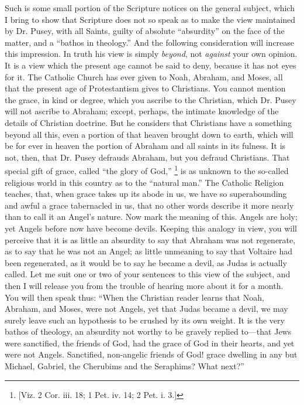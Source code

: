 Such is some small portion of the Scripture
notices on the general subject, which I bring to show that Scripture
does not so speak as to make the view maintained by Dr. Pusey, with
all Saints, guilty of absolute ``absurdity'' on the face of the matter,
and a ``bathos in theology.'' And the following consideration will
increase this impression. In truth his view is simply \emph{beyond},
not \emph{against} your own opinion. It is a view which the present
age cannot be said to deny, because it has not eyes for it. The
Catholic Church has ever given to Noah, Abraham, and Moses, all that
the present age of Protestantism gives to Christians. You cannot
mention the grace, in kind or degree, which you ascribe to the
Christian, which Dr. Pusey will not ascribe to Abraham; except,
perhaps, the intimate knowledge of the details of Christian doctrine.
But he considers that Christians have a something beyond all
this, even a portion of that heaven brought down to earth, which will
be for ever in heaven the portion of Abraham and all saints in its
fulness. It is not, then, that Dr. Pusey defrauds Abraham, but you
defraud Christians. That special gift of grace, called ``the glory of
God,'' \footnote{[Viz. 2 Cor. iii. 18; 1 Pet. iv. 14; 2 Pet. i. 3.]} is as unknown to
the so-called religious world in this country as to the ``natural man.''
The Catholic Religion teaches, that, when grace takes up its abode in
us, we have so superabounding and awful a grace tabernacled in us,
that no other words describe it more nearly than to call it an Angel's
nature. Now mark the meaning of this. Angels are holy; yet Angels
before now have become devils. Keeping this analogy in view, you will
perceive that it is as little an absurdity to say that Abraham was not
regenerate, as to say that he was not an Angel; as little unmeaning to
say that Voltaire had been regenerated, as it would be to say he
became a devil, as Judas is actually called. Let me suit one or two of
your sentences to this view of the subject, and then I will release
you from the trouble of hearing more about it for a month. You will
then speak thus: ``When the Christian reader learns that Noah, Abraham,
and Moses, were not Angels, yet that Judas became a devil, we may
surely leave such an hypothesis to be crushed by its own weight. It is
the very bathos of theology, an absurdity not worthy to be gravely
replied to—that Jews were sanctified, the friends of God, had the
grace of God in their hearts, and yet were not Angels. Sanctified,
non-angelic friends of God! grace dwelling in any but Michael,
Gabriel, the Cherubims and the Seraphims? What next?''

